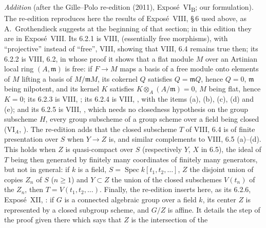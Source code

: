 \par\medskip\noindent
\emph{Addition} (after the Gille--Polo re-edition (2011), Expos\'e~VI\textsubscript{B}; our formulation).
The re-edition reproduces here the results of Expos\'e~VIII, \S\,6 used above, as A.~Grothendieck suggests at the
beginning of that section; in this edition they are in Expos\'e~VIII.
\label{def:sga3-VIB-6.2.1}%
Its 6.2.1 is VIII,  (essentially free morphisms), with ``projective''
instead of ``free'', VIII,  showing that VIII, 6.4 remains true then; its
6.2.2 is VIII, 6.2, in whose proof it shows that a flat module \(M\) over an Artinian local ring \((A,\mathfrak m)\)
is free: if \(F\to M\) maps a basis of a free module onto elements of \(M\) lifting a basis of
\(M/\mathfrak mM\), its cokernel \(Q\) satisfies \(Q=\mathfrak mQ\), hence \(Q=0\), \(\mathfrak m\) being
nilpotent, and its kernel \(K\) satisfies \(K\otimes_A(A/\mathfrak m)=0\), \(M\) being flat, hence \(K=0\);
\label{thm:sga3-VIB-6.2.3}%
its 6.2.3 is VIII, ;
\label{ex:sga3-VIB-6.2.4-a}%
its 6.2.4 is VIII, , with the items (a),
\label{ex:sga3-VIB-6.2.4-b}%
(b), (c), (d) and
\label{ex:sga3-VIB-6.2.4-e}%
(e); and its 6.2.5 is VIII, , which needs no closedness hypothesis on
the group subscheme \(H\), every group subscheme of a group scheme over a field being closed
(VI\(_A\), ). The re-edition adds that the closed subscheme \(T\) of VIII, 6.4 is
of finite presentation over \(S\) when \(Y\to Z\) is, and similar complements to VIII, 6.5 (a)--(d). This holds when
\(Z\) is quasi-compact over \(S\) (respectively \(Y\), \(X\) in 6.5), the ideal of \(T\) being then generated by
finitely many coordinates of finitely many generators, but not in general: if \(k\) is a field,
\(S=\operatorname{Spec}k[t_1,t_2,\ldots]\), \(Z\) the disjoint union of copies \(Z_n\) of \(S\) (\(n\geq1\)) and
\(Y\subset Z\) the union of the closed subschemes \(V(t_n)\) of the \(Z_n\), then \(T=V(t_1,t_2,\ldots)\).
\label{cor:sga3-VIB-6.2.6}%
Finally, the re-edition inserts here, as its 6.2.6, Expos\'e~XII, : if \(G\) is a
connected algebraic group over a field \(k\), its center \(Z\) is represented by a closed subgroup scheme, and
\(G/Z\) is affine. It details the step of the proof given there which says that \(Z\) is the intersection of the
